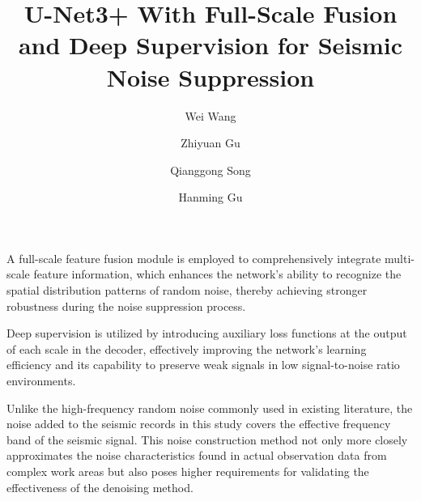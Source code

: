 \documentclass[preprint,12pt]{elsarticle}
\begin{document}
\begin{frontmatter}

\title{U-Net3+ With Full-Scale Fusion and Deep Supervision for Seismic Noise Suppression}

\author[label1]{Wei Wang} %
\author[label2]{Zhiyuan Gu} %
\author[label3]{Qianggong Song} %
\author[label1]{Hanming Gu} %

            

\begin{highlights}
    \item A full-scale feature fusion module is employed to comprehensively integrate multi-scale feature information, which enhances the network's ability to recognize the spatial distribution patterns of random noise, thereby achieving stronger robustness during the noise suppression process.
    \item Deep supervision is utilized by introducing auxiliary loss functions at the output of each scale in the decoder, effectively improving the network's learning efficiency and its capability to preserve weak signals in low signal-to-noise ratio environments.
    \item Unlike the high-frequency random noise commonly used in existing literature, the noise added to the seismic records in this study covers the effective frequency band of the seismic signal. This noise construction method not only more closely approximates the noise characteristics found in actual observation data from complex work areas but also poses higher requirements for validating the effectiveness of the denoising method.
\end{highlights}


\end{frontmatter}
\end{document}

